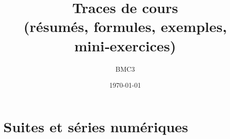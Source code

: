\documentclass[11pt,a4paper]{report}
\title{\textbf{Traces de cours}\\\large (résumés, formules, exemples, mini‑exercices)}
\author{ BMC3 }
\date{\today}
\begin{document}
\chapter{Suites et séries numériques}



% 
\end{document}

